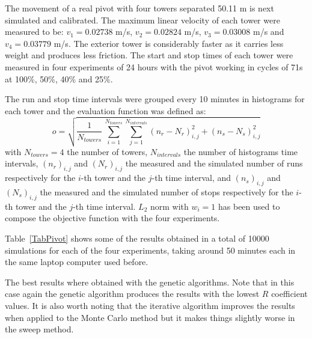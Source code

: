 \documentclass[review,authoryear]{elsarticle}
\newcommand{\EQ}[2]
{\begin{equation}#1\label{#2}\end{equation}}
\newcommand{\PA}[1]{\left(#1\right)}
\begin{document}
The movement of a real pivot with four towers separated 50.11 m is next simulated and calibrated. The maximum linear velocity of each tower were measured to be: $v_1=0.02738$ m/s, $v_2=0.02824$ m/s, $v_3=0.03008$ m/s and $v_4=0.03779$ m/s.
The exterior tower is considerably faster as it carries less weight and produces less friction.
The start and stop times of each tower were measured in four experiments of 24 hours with the pivot working in cycles of 71s at 100\%, 50\%, 40\% and 25\%.

The run and stop time intervals were grouped every 10 minutes in histograms for each tower and the evaluation function was defined as:
\EQ
{
	o=\sqrt{\frac{1}{N_{towers}}\,\sum_{i=1}^{N_{towers}}
	\sum_{j=1}^{N_{intervals}}\PA{n_r-N_r}_{i,j}^2+\PA{n_s-N_s}_{i,j}^2}
}{EqPivotObjective}
with $N_{towers}=4$ the number of towers, $N_{intervals}$ the number of
histograms time intervals, $\PA{n_r}_{i,j}$ and $\PA{N_r}_{i,j}$ the measured
and the simulated number of runs respectively for the $i$-th tower and the
$j$-th time interval, and $\PA{n_s}_{i,j}$ and $\PA{N_s}_{i,j}$ the measured
and the simulated number of stops respectively for the $i$-th tower and the
$j$-th time interval. $L_2$ norm with $w_i=1$ has been used to compose the
objective function with the four experiments.

Table~\ref{TabPivot} shows some of the results obtained in a total of 10000 simulations for each of the four experiments, taking around 50 minutes each in the same laptop computer used before.

The best results where obtained with the genetic algorithms. Note that in this case again the genetic algorithm produces the results with the lowest $R$ coefficient values. It is also worth noting that the iterative algorithm improves the results when applied to the Monte Carlo method but it makes things slightly worse in the sweep method.
\end{document}
